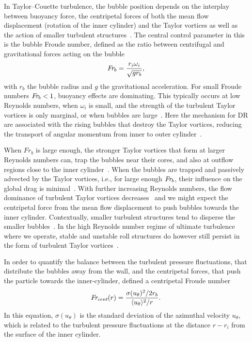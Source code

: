 \documentclass[aps,twocolumn,10pt,floatfix, superscriptaddress,longbibliography,pra]{revtex4-1}
\newcommand\Fr{\mbox{\textit{Fr$_b$}}}  %
\newcommand\Frcent{\mbox{\textit{Fr$_\text{cent}$}}}  %
\begin{document}
In Taylor--Couette turbulence, the bubble position depends on the interplay between buoyancy force, the centripetal forces of both the mean flow displacement (rotation of the inner cylinder) and the Taylor vortices as well as the action of smaller turbulent structures~\citep{Djeridi1999,Chouippe2014,Fokoua2015,Lohse2018}. The central control parameter in this is the bubble Froude number, defined as the ratio between centrifugal and gravitational forces acting on the bubble
\begin{equation}\label{eq:Fr}
    \Fr = \frac{r_i \omega_i}{\sqrt{g r_b }},
\end{equation}
with $r_b$ the bubble radius and $g$ the gravitational acceleration. For small Froude numbers $\Fr < 1$, buoyancy effects are dominating. This typically occurs at low Reynolds numbers, when $\omega_i$ is small, and the strength of the turbulent Taylor vortices is only marginal, or  when bubbles are large~\citep{Climent2007,Lohse2018}. Here the mechanism for DR are associated with the rising bubbles that destroy the Taylor vortices, reducing the transport of angular momentum from inner to outer cylinder~\citep{Spandan2018,Lohse2018}.

When $Fr_b$ is large enough, the stronger Taylor vortices that form at larger Reynolds numbers can, trap the bubbles near their cores, and also at outflow regions close to the inner cylinder~\citep{Climent2007,Fokoua2015}. When the bubbles are trapped and passively advected by the Taylor vortices, i.e., for large enough $\Fr$, their influence on the global drag is minimal~\citep{Lohse2018,Spandan2018}. With further increasing Reynolds numbers, the flow dominance of turbulent Taylor vortices decreases~\citep{vanGils2012,Huisman2014} and we might expect the centripetal force from the mean flow displacement to push bubbles towards the inner cylinder. Contextually, smaller turbulent structures tend to disperse the smaller bubbles~\citep{vanGils2013,Chouippe2014}. In the high Reynolds number regime of ultimate turbulence where we operate, stable and unstable roll structures do however still persist in the form of turbulent Taylor vortices~\citep{Huisman2014}.

In order to quantify the balance between the turbulent pressure fluctuations, that distribute the bubbles away from the wall, and the centripetal forces, that push the particle towards the inner-cylinder, \cite{vanGils2013} defined a centripetal Froude number
\begin{equation}\label{eq:Fr_cent}
    \Frcent(r) = \frac{\sigma(u_\theta)^2 / 2r_b}{\langle u_\theta \rangle^2 / r}.
\end{equation}
In this equation, $\sigma(u_\theta)$ is the standard deviation of the azimuthal velocity $u_\theta$, which is related to the turbulent pressure fluctuations at the distance $r-r_i$ from the surface of the inner cylinder.
\end{document}
